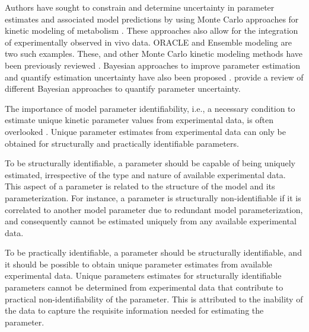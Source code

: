 \documentclass[10pt]{article}
\begin{document}
	
	Authors have sought to constrain and determine uncertainty in parameter estimates and associated model predictions by using Monte Carlo approaches for kinetic modeling of metabolism \parencite{Andreozzi2016a}. These approaches also allow for the integration of experimentally observed in vivo data. ORACLE \parencite{Wang2004} and Ensemble modeling \parencite{Tran2008} are two such examples. These, and other Monte Carlo kinetic modeling methods have been previously reviewed \parencite{Srinivasan2015}. Bayesian approaches to improve parameter estimation and quantify estimation uncertainty have also been proposed \parencite{Saa2016}. \textcite{Vanlier2013} provide a review of different Bayesian approaches to quantify parameter uncertainty.	 
	
	The importance of model parameter identifiability, i.e., a necessary condition to estimate unique kinetic parameter values from experimental data, is often overlooked \parencite{Rodriguez-Fernandez2006,Berthoumieux2013}. Unique parameter estimates from experimental data can only be obtained for structurally and practically identifiable parameters. 
	
	To be structurally identifiable, a parameter should be capable of being uniquely estimated, irrespective of the type and nature of available experimental data. This aspect of a parameter is related to the structure of the model and its parameterization. For instance, a parameter is structurally non-identifiable if it is correlated to another model parameter due to redundant model parameterization, and consequently cannot be estimated uniquely from any available experimental data. 
	
	To be practically identifiable, a parameter should be structurally identifiable, and it should be possible to obtain unique parameter estimates from available experimental data. Unique parameters estimates for structurally identifiable parameters cannot be determined from experimental data that contribute to practical non-identifiability of the parameter. This is attributed to the inability of the data to capture the requisite information needed for estimating the parameter.	
	
	
\end{document}
